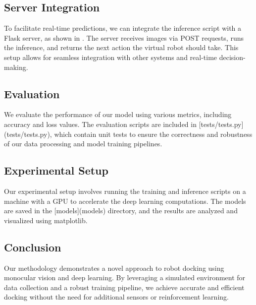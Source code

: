 \subsection{Server Integration}
To facilitate real-time predictions, we can integrate the inference script with a Flask server, as shown in . The server receives images via POST requests, runs the inference, and returns the next action the virtual robot should take. This setup allows for seamless integration with other systems and real-time decision-making.

\subsection{Evaluation}
We evaluate the performance of our model using various metrics, including accuracy and loss values. The evaluation scripts are included in [tests/tests.py](tests/tests.py), which contain unit tests to ensure the correctness and robustness of our data processing and model training pipelines.

\subsection{Experimental Setup}
Our experimental setup involves running the training and inference scripts on a machine with a GPU to accelerate the deep learning computations. The models are saved in the [models](models) directory, and the results are analyzed and visualized using matplotlib.

\subsection{Conclusion}
Our methodology demonstrates a novel approach to robot docking using monocular vision and deep learning. By leveraging a simulated environment for data collection and a robust training pipeline, we achieve accurate and efficient docking without the need for additional sensors or reinforcement learning.
